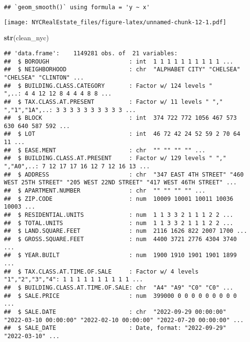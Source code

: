 \documentclass[
]{article}
\newenvironment{Shaded}{\begin{snugshade}}{\end{snugshade}}
\newcommand{\FunctionTok}[1]{\textcolor[rgb]{0.13,0.29,0.53}{\textbf{#1}}}
\newcommand{\NormalTok}[1]{#1}
\begin{document}
\begin{verbatim}
## `geom_smooth()` using formula = 'y ~ x'
\end{verbatim}

\texttt{[image: NYCRealEstate\_files/figure-latex/unnamed-chunk-12-1.pdf]}

\begin{Shaded}
\begin{Highlighting}[]
\FunctionTok{str}\NormalTok{(clean\_nyc)}
\end{Highlighting}
\end{Shaded}

\begin{verbatim}
## 'data.frame':    1149281 obs. of  21 variables:
##  $ BOROUGH                       : int  1 1 1 1 1 1 1 1 1 1 ...
##  $ NEIGHBORHOOD                  : chr  "ALPHABET CITY" "CHELSEA" "CHELSEA" "CLINTON" ...
##  $ BUILDING.CLASS.CATEGORY       : Factor w/ 124 levels "                                            ",..: 4 4 12 12 8 4 4 4 8 8 ...
##  $ TAX.CLASS.AT.PRESENT          : Factor w/ 11 levels " ","  ","1","1A",..: 3 3 3 3 3 3 3 3 3 3 ...
##  $ BLOCK                         : int  374 722 772 1056 467 573 630 640 587 592 ...
##  $ LOT                           : int  46 72 42 24 52 59 2 70 64 11 ...
##  $ EASE.MENT                     : chr  "" "" "" "" ...
##  $ BUILDING.CLASS.AT.PRESENT     : Factor w/ 129 levels " ","  ","A0",..: 7 12 17 17 16 12 7 12 16 13 ...
##  $ ADDRESS                       : chr  "347 EAST 4TH STREET" "460 WEST 25TH STREET" "205 WEST 22ND STREET" "417 WEST 46TH STREET" ...
##  $ APARTMENT.NUMBER              : chr  "" "" "" "" ...
##  $ ZIP.CODE                      : num  10009 10001 10011 10036 10003 ...
##  $ RESIDENTIAL.UNITS             : num  1 1 3 3 2 1 1 1 2 2 ...
##  $ TOTAL.UNITS                   : num  1 1 3 3 2 1 1 1 2 2 ...
##  $ LAND.SQUARE.FEET              : num  2116 1626 822 2007 1700 ...
##  $ GROSS.SQUARE.FEET             : num  4400 3721 2776 4304 3740 ...
##  $ YEAR.BUILT                    : num  1900 1910 1901 1901 1899 ...
##  $ TAX.CLASS.AT.TIME.OF.SALE     : Factor w/ 4 levels "1","2","3","4": 1 1 1 1 1 1 1 1 1 1 ...
##  $ BUILDING.CLASS.AT.TIME.OF.SALE: chr  "A4" "A9" "C0" "C0" ...
##  $ SALE.PRICE                    : num  399000 0 0 0 0 0 0 0 0 0 ...
##  $ SALE.DATE                     : chr  "2022-09-29 00:00:00" "2022-03-10 00:00:00" "2022-02-10 00:00:00" "2022-07-20 00:00:00" ...
##  $ SALE_DATE                     : Date, format: "2022-09-29" "2022-03-10" ...
\end{verbatim}
\end{document}
